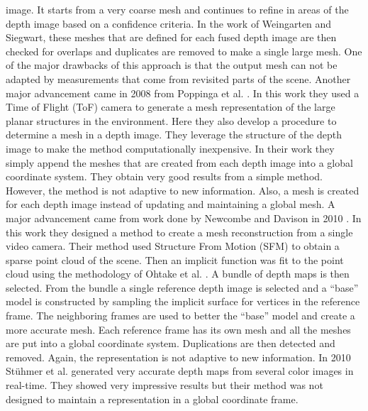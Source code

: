 image. It starts from a very coarse mesh and continues to refine in areas of the
depth image based on a confidence criteria. In the work of Weingarten and
Siegwart, these meshes that are defined for each fused depth image are then
checked for overlaps and duplicates are removed to make a single large mesh. One
of the major drawbacks of this approach is that the output mesh can not be
adapted by measurements that come from revisited parts of the scene. Another
major advancement came in 2008 from Poppinga et al. \cite{Poppinga2008}. In this
work they used a Time of Flight (ToF) camera to generate a mesh representation
of the large planar structures in the environment. Here they also develop a
procedure to determine a mesh in a depth image. They leverage the structure of
the depth image to make the method computationally inexpensive. In their work
they simply append the meshes that are created from each depth image into a
global coordinate system. They obtain very good results from a simple method.
However, the method is not adaptive to new information. Also, a mesh is created
for each depth image instead of updating and maintaining a global mesh. A major
advancement came from work done by Newcombe and Davison in 2010
\cite{Newcombe2010}. In this work they designed a method to create a mesh
reconstruction from a single video camera. Their method used Structure From
Motion (SFM) to obtain a sparse point cloud of the scene. Then an implicit
function was fit to the point cloud using the methodology of Ohtake et al.
\cite{Ohtake2003}. A bundle of depth maps is then selected. From the bundle a
single reference depth image is selected and a ``base'' model is constructed by
sampling the implicit surface for vertices in the reference frame. The
neighboring frames are used to better the ``base'' model and create a more
accurate mesh. Each reference frame has its own mesh and all the meshes are put
into a global coordinate system. Duplications are then detected and removed.
Again, the representation is not adaptive to new information. In 2010
St\"{u}hmer et al. \cite{Stuhmer2010} generated very accurate depth maps from
several color images in real-time. They showed very impressive results but their
method was not designed to maintain a representation in a global coordinate
frame.

